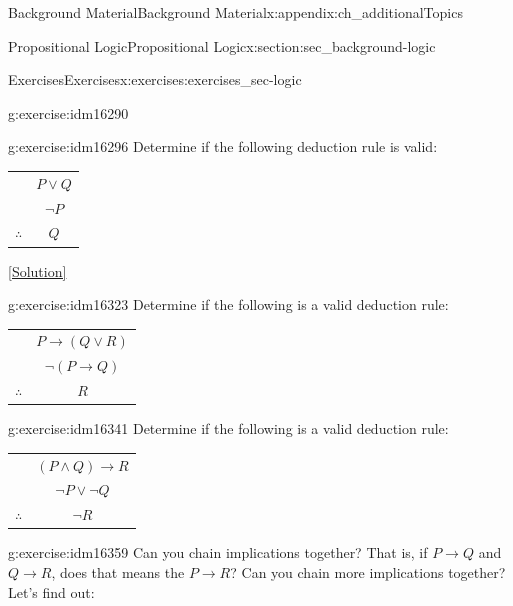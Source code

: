\documentclass[oneside,10pt,]{book}
\numberwithin{equation}{chapter}
\newcommand{\hrulethin}  {\noalign{\hrule height 0.04em}}
\def\imp{\rightarrow}
\begin{document}
\begin{appendixptx}{Background Material}{}{Background Material}{}{}{x:appendix:ch_additionalTopics}
\begin{sectionptx}{Propositional Logic}{}{Propositional Logic}{}{}{x:section:sec_background-logic}
\begin{exercises-subsection}{Exercises}{}{Exercises}{}{}{x:exercises:exercises_sec-logic}
\begin{divisionexercise}{9}{}{}{g:exercise:idm16290}
\end{divisionexercise}%
\begin{divisionexercise}{10}{}{}{g:exercise:idm16296}%
Determine if the following deduction rule is valid:%
\begin{sidebyside}{1}{0}{0}{0}%
\begin{sbspanel}{1}%
{\centering%
\begin{tabular}{cc}
&\(P \vee Q\)\tabularnewline[0pt]
&\(\neg P\)\tabularnewline\hrulethin
\(\therefore\)&\(Q\)
\end{tabular}
\par}
\end{sbspanel}%
\end{sidebyside}%
\space\hspace*{0pt}\hfill{\tiny\hyperlink{g:solution:idm16314-main}{[Solution]}}\end{divisionexercise}%
\begin{divisionexercise}{11}{}{}{g:exercise:idm16323}%
Determine if the following is a valid deduction rule:%
\begin{sidebyside}{1}{0}{0}{0}%
\begin{sbspanel}{1}%
{\centering%
\begin{tabular}{cc}
&\(P \imp (Q \vee R)\)\tabularnewline[0pt]
&\(\neg(P \imp Q)\)\tabularnewline\hrulethin
\(\therefore\)&\(R\)
\end{tabular}
\par}
\end{sbspanel}%
\end{sidebyside}%
\end{divisionexercise}%
\begin{divisionexercise}{12}{}{}{g:exercise:idm16341}%
Determine if the following is a valid deduction rule:%
\begin{sidebyside}{1}{0}{0}{0}%
\begin{sbspanel}{1}%
{\centering%
\begin{tabular}{cc}
&\((P \wedge Q) \imp R\)\tabularnewline[0pt]
&\(\neg P \vee \neg Q\)\tabularnewline\hrulethin
\(\therefore\)&\(\neg R\)
\end{tabular}
\par}
\end{sbspanel}%
\end{sidebyside}%
\end{divisionexercise}%
\begin{divisionexercise}{13}{}{}{g:exercise:idm16359}%
Can you chain implications together? That is, if \(P \imp Q\) and \(Q \imp R\), does that means the \(P \imp R\)? Can you chain more implications together? Let's find out:%

\end{divisionexercise}
\end{exercises-subsection}
\end{sectionptx}
\end{appendixptx}
\end{document}
